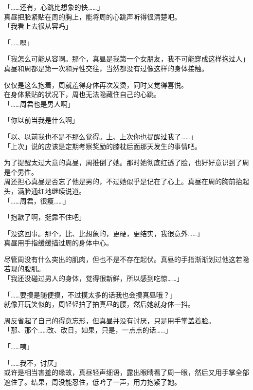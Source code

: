 「……还有，心跳比想象的快……」\\

真昼把脸紧贴在周的胸上，能将周的心跳声听得很清楚吧。\\

「我看上去很从容吗」

「……嗯」

「我怎么可能从容啊。那个，真昼是我第一个女朋友，我不可能穿成这样抱过人」\\

真昼和周都是第一次和异性交往，当然都没有过像这样的身体接触。

仅仅是这么抱着，周就羞得身体再次发烫，同时又觉得喜悦。\\

在身体紧贴的状况下，周也无法隐藏住自己的心跳。\\

「……周君也是男人啊」

「你以前当我是什么啊」

「以、以前我也不是不那么觉得。上、上次你也提醒过我了……」\\

「上次」说的应该是定期考察奖励的膝枕后面那天发生的事情吧。

为了提醒太过大意的真昼，周推倒了她。那时她彻底红透了脸，也好好意识到了周是个男性。\\

周还担心真昼是否忘了他是男的，不过她似乎是记在了心上。真昼在周的胸前抬起头，满脸通红地继续说道。\\

「……周君，很瘦……」

「抱歉了啊，挺靠不住吧」

「没这回事。那个，比、比想象的，更硬，更结实，我很意外……」\\

真昼用手指缓缓描过周的身体中心。

尽管周没有什么突出的肌肉，但也不是不存在起伏。真昼的手指渐渐划过他这若隐若现的腹肌。\\

「我还没碰过男人的身体，觉得很新鲜，所以感到吃惊……」

「……要摸是随便摸，不过摸太多的话我也会摸真昼哦？」\\

就像开玩笑似的，周轻轻拍了拍真昼的腰，然后她就身体一抖。

周反省起了自己的得意忘形，但真昼并没有讨厌，只是用手掌盖着脸。\\

「那、那个……改、改日，如果，只是，一点点的话……」

「……咦」

「……我不，讨厌」\\

或许是相当害羞的缘故，真昼轻声细语，露出眼睛看了周一眼，然后又用手掌全部遮住了。结果，周没能忍住，低吟了一声，用力抱紧了她。

